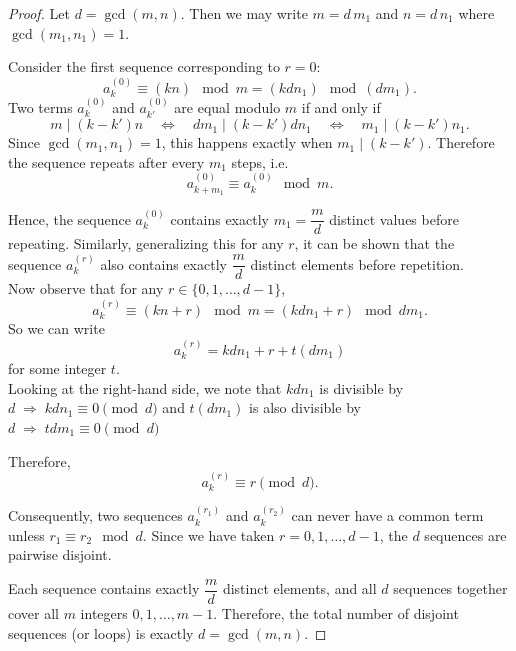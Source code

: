 \documentclass[12pt,a4paper]{article}
\theoremstyle{remark} %
\theoremstyle{example} %
\theoremstyle{proposition}
\newtheorem{proposition}{Proposition}
\begin{document}
\begin{proof}
Let $d=\gcd(m,n)$. 
Then we may write $m=d\,m_1$ and $n=d\,n_1$ where $\gcd(m_1,n_1)=1$.

\noindent Consider the first sequence corresponding to $r=0$:
\[
a^{(0)}_k \equiv (k n) \mod m = (k d n_1) \mod{(d m_1)}.
\]
Two terms $a^{(0)}_k$ and $a^{(0)}_{k'}$ are equal modulo $m$ if and only if 
\[
m \mid (k-k')n \quad \iff\quad d m_1 \mid (k-k')d n_1 
\quad \iff\quad m_1 \mid (k-k')n_1.
\]
Since $\gcd(m_1,n_1)=1$, this happens exactly when $m_1\mid (k-k')$. 
Therefore the sequence repeats after every $m_1$ steps, i.e.
\[
a^{(0)}_{k+m_1} \equiv a^{(0)}_k \mod m.
\]

Hence, the sequence $a^{(0)}_k$ contains exactly $m_1 = \dfrac{m}{d}$ distinct values before repeating. 
Similarly, generalizing this for any $r$, it can be shown that the sequence $a^{(r)}_k$ also contains exactly $\dfrac{m}{d}$ distinct elements before repetition.\\


\noindent Now observe that for any $r\in\{0,1,\dots,d-1\}$,
\[
a^{(r)}_k \equiv (k n + r) \mod m = (k d n_1 + r) \mod{d m_1}.
\]
\noindent
So we can write
\[
a^{(r)}_k = k d n_1 + r + t (d m_1)
\]
for some integer \(t\).\\


\noindent
Looking at the right-hand side, we note that \(k d n_1\) is divisible by \(d \;\Rightarrow\; k d n_1 \equiv 0 \pmod{d}\) and \(t (d m_1)\) is also divisible by \(d \;\Rightarrow\; t d m_1 \equiv 0 \pmod{d}\) 

\noindent
Therefore,
\[
a^{(r)}_k \equiv r \pmod{d}.
\]

\noindent Consequently, two sequences $a^{(r_1)}_k$ and $a^{(r_2)}_k$ can never have a common term unless $r_1\equiv r_2 \mod d$. 
Since we have taken $r=0,1,\dots,d-1$, the $d$ sequences are pairwise disjoint.

\noindent Each sequence contains exactly $\dfrac{m}{d}$ distinct elements, and all $d$ sequences together cover all $m$ integers $0,1,\dots,m-1$. 
Therefore, the total number of disjoint sequences (or loops) is exactly $d=\gcd(m,n)$.
 
\end{proof}



    
\end{document}

